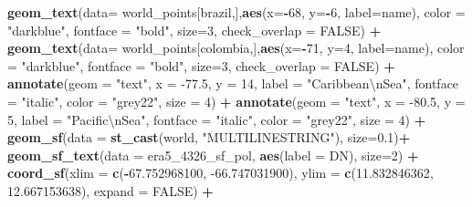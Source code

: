 \documentclass[12pt,twoside]{reedthesis}
\newenvironment{Shaded}{\begin{snugshade}}{\end{snugshade}}
\newcommand{\CharTok}[1]{\textcolor[rgb]{0.31,0.60,0.02}{#1}}
\newcommand{\DataTypeTok}[1]{\textcolor[rgb]{0.13,0.29,0.53}{#1}}
\newcommand{\DecValTok}[1]{\textcolor[rgb]{0.00,0.00,0.81}{#1}}
\newcommand{\FloatTok}[1]{\textcolor[rgb]{0.00,0.00,0.81}{#1}}
\newcommand{\KeywordTok}[1]{\textcolor[rgb]{0.13,0.29,0.53}{\textbf{#1}}}
\newcommand{\NormalTok}[1]{#1}
\newcommand{\OperatorTok}[1]{\textcolor[rgb]{0.81,0.36,0.00}{\textbf{#1}}}
\newcommand{\OtherTok}[1]{\textcolor[rgb]{0.56,0.35,0.01}{#1}}
\newcommand{\StringTok}[1]{\textcolor[rgb]{0.31,0.60,0.02}{#1}}
\begin{document}
\begin{Shaded}
\begin{Highlighting}[]
\StringTok{  }\KeywordTok{geom_text}\NormalTok{(}\DataTypeTok{data=}\NormalTok{ world_points[brazil,],}\KeywordTok{aes}\NormalTok{(}\DataTypeTok{x=}\OperatorTok{-}\DecValTok{68}\NormalTok{, }\DataTypeTok{y=}\OperatorTok{-}\DecValTok{6}\NormalTok{, }\DataTypeTok{label=}\NormalTok{name), }\DataTypeTok{color =} \StringTok{"darkblue"}\NormalTok{, }\DataTypeTok{fontface =} \StringTok{"bold"}\NormalTok{, }\DataTypeTok{size=}\DecValTok{3}\NormalTok{, }\DataTypeTok{check_overlap =} \OtherTok{FALSE}\NormalTok{) }\OperatorTok{+}
\StringTok{  }\KeywordTok{geom_text}\NormalTok{(}\DataTypeTok{data=}\NormalTok{ world_points[colombia,],}\KeywordTok{aes}\NormalTok{(}\DataTypeTok{x=}\OperatorTok{-}\DecValTok{71}\NormalTok{, }\DataTypeTok{y=}\DecValTok{4}\NormalTok{, }\DataTypeTok{label=}\NormalTok{name), }\DataTypeTok{color =} \StringTok{"darkblue"}\NormalTok{, }\DataTypeTok{fontface =} \StringTok{"bold"}\NormalTok{, }\DataTypeTok{size=}\DecValTok{3}\NormalTok{, }\DataTypeTok{check_overlap =} \OtherTok{FALSE}\NormalTok{) }\OperatorTok{+}
\StringTok{  }\KeywordTok{annotate}\NormalTok{(}\DataTypeTok{geom =} \StringTok{"text"}\NormalTok{, }\DataTypeTok{x =} \FloatTok{-77.5}\NormalTok{, }\DataTypeTok{y =} \DecValTok{14}\NormalTok{, }\DataTypeTok{label =} \StringTok{"Caribbean}\CharTok{\textbackslash{}n}\StringTok{Sea"}\NormalTok{, }\DataTypeTok{fontface =} \StringTok{"italic"}\NormalTok{, }\DataTypeTok{color =} \StringTok{"grey22"}\NormalTok{, }\DataTypeTok{size =} \DecValTok{4}\NormalTok{) }\OperatorTok{+}\StringTok{ }
\StringTok{  }\KeywordTok{annotate}\NormalTok{(}\DataTypeTok{geom =} \StringTok{"text"}\NormalTok{, }\DataTypeTok{x =} \FloatTok{-80.5}\NormalTok{, }\DataTypeTok{y =} \DecValTok{5}\NormalTok{, }\DataTypeTok{label =} \StringTok{"Pacific}\CharTok{\textbackslash{}n}\StringTok{Sea"}\NormalTok{, }\DataTypeTok{fontface =} \StringTok{"italic"}\NormalTok{, }\DataTypeTok{color =} \StringTok{"grey22"}\NormalTok{, }\DataTypeTok{size =} \DecValTok{4}\NormalTok{) }\OperatorTok{+}
\StringTok{  }\KeywordTok{geom_sf}\NormalTok{(}\DataTypeTok{data =} \KeywordTok{st_cast}\NormalTok{(world, }\StringTok{"MULTILINESTRING"}\NormalTok{),  }\DataTypeTok{size=}\FloatTok{0.1}\NormalTok{)}\OperatorTok{+}
\StringTok{  }\KeywordTok{geom_sf_text}\NormalTok{(}\DataTypeTok{data =}\NormalTok{ era5_}\DecValTok{4326}\NormalTok{_sf_pol, }\KeywordTok{aes}\NormalTok{(}\DataTypeTok{label =}\NormalTok{ DN), }\DataTypeTok{size=}\DecValTok{2}\NormalTok{) }\OperatorTok{+}
\StringTok{  }\KeywordTok{coord_sf}\NormalTok{(}\DataTypeTok{xlim =} \KeywordTok{c}\NormalTok{(}\OperatorTok{-}\FloatTok{67.752968100}\NormalTok{, }\FloatTok{-66.747031900}\NormalTok{), }\DataTypeTok{ylim =} \KeywordTok{c}\NormalTok{(}\FloatTok{11.832846362}\NormalTok{, }\FloatTok{12.667153638}\NormalTok{), }\DataTypeTok{expand =} \OtherTok{FALSE}\NormalTok{) }\OperatorTok{+}

\end{Highlighting}
\end{Shaded}
\end{document}
